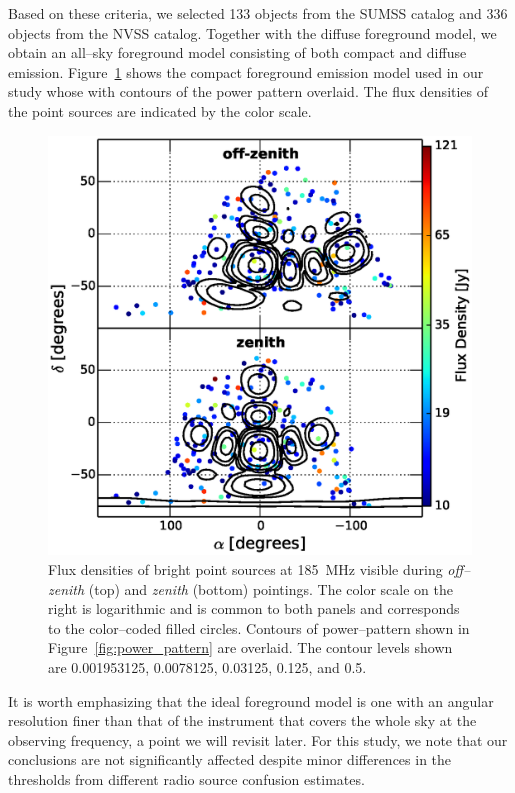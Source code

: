 \documentclass[preprint2,iop,numberedappendix]{emulateapj}
\begin{document}
Based on these criteria, we selected 133 objects from the SUMSS catalog and 336 objects from the NVSS catalog. Together with the diffuse foreground model, we obtain an all--sky foreground model consisting of both compact and diffuse emission. Figure~\ref{fig:CSM} shows the compact foreground emission model used in our study whose with contours of the power pattern overlaid. The flux densities of the point sources are indicated by the color scale. 

\begin{figure}[htb]
\centering
\includegraphics[width=\linewidth]{figures/v1_0/csm.eps}
\caption{Flux densities of bright point sources at 185~MHz visible during {\it off--zenith} (top) and {\it zenith} (bottom) pointings. The color scale on the right is logarithmic and is common to both panels and corresponds to the color--coded filled circles. Contours of power--pattern shown in Figure~\ref{fig:power_pattern} are overlaid. The contour levels shown are 0.001953125, 0.0078125, 0.03125, 0.125, and 0.5. \label{fig:CSM}}
\end{figure}

It is worth emphasizing that the ideal foreground model is one with an angular resolution finer than that of the instrument that covers the whole sky at the observing frequency, a point we will revisit later. For this study, we note that our conclusions are not significantly affected despite minor differences in the thresholds from different radio source confusion estimates.
\end{document}
